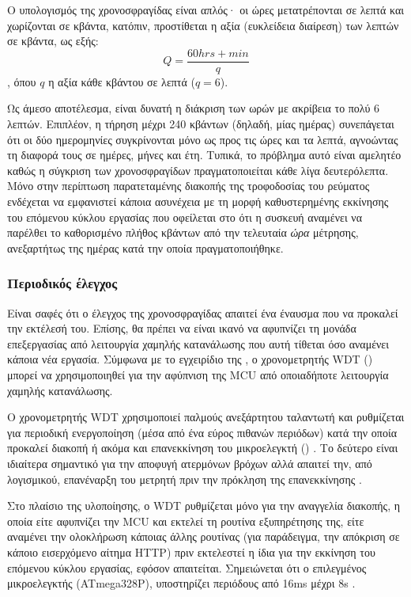 Ο υπολογισμός της χρονοσφραγίδας είναι απλός· οι ώρες μετατρέπονται σε λεπτά και
χωρίζονται σε κβάντα, κατόπιν, προστίθεται η αξία (ευκλείδεια διαίρεση) των
λεπτών σε κβάντα, ως εξής:
\begin{equation}
Q = \frac{60 hrs + min}{q}
\end{equation}
, όπου $q$ η αξία κάθε κβάντου σε λεπτά ($q = 6$).

Ως άμεσο αποτέλεσμα, είναι δυνατή η διάκριση των ωρών με ακρίβεια το πολύ 6
λεπτών. Επιπλέον, η τήρηση μέχρι 240 κβάντων (δηλαδή, μίας ημέρας) συνεπάγεται
ότι οι δύο ημερομηνίες συγκρίνονται μόνο ως προς τις ώρες και τα λεπτά,
αγνοώντας τη διαφορά τους σε ημέρες, μήνες και έτη. Τυπικά, το πρόβλημα αυτό
είναι αμελητέο καθώς η σύγκριση των χρονοσφραγίδων πραγματοποιείται κάθε λίγα
δευτερόλεπτα. Μόνο στην περίπτωση παρατεταμένης διακοπής της τροφοδοσίας του
ρεύματος ενδέχεται να εμφανιστεί κάποια ασυνέχεια με τη μορφή καθυστερημένης
εκκίνησης του επόμενου κύκλου εργασίας που οφείλεται στο ότι η συσκευή αναμένει
να παρέλθει το καθορισμένο πλήθος κβάντων από την τελευταία \emph{ώρα} μέτρησης,
ανεξαρτήτως της ημέρας κατά την οποία πραγματοποιήθηκε.


\subsubsection{Περιοδικός έλεγχος}

Είναι σαφές ότι ο έλεγχος της χρονοσφραγίδας απαιτεί ένα έναυσμα που να προκαλεί
την εκτέλεσή του. Επίσης, θα πρέπει να είναι ικανό να αφυπνίζει τη μονάδα
επεξεργασίας από λειτουργία χαμηλής κατανάλωσης που αυτή τίθεται όσο αναμένει
κάποια νέα εργασία. Σύμφωνα με το εγχειρίδιο της \textcite[38]{atmel13}, ο
χρονομετρητής WDT () μπορεί να χρησιμοποιηθεί για την
αφύπνιση της MCU από οποιαδήποτε λειτουργία χαμηλής κατανάλωσης.

Ο χρονομετρητής WDT χρησιμοποιεί παλμούς ανεξάρτητου ταλαντωτή και ρυθμίζεται
για περιοδική ενεργοποίηση (μέσα από ένα εύρος πιθανών περιόδων) κατά την οποία
προκαλεί διακοπή ή ακόμα και επανεκκίνηση του μικροελεγκτή ()
\parencite[50]{atmel13}. Το δεύτερο είναι ιδιαίτερα σημαντικό για την αποφυγή
ατερμόνων βρόχων αλλά απαιτεί την, από λογισμικού, επανέναρξη του μετρητή πριν
την πρόκληση της επανεκκίνησης \parencite[50]{atmel13}.

Στο πλαίσιο της υλοποίησης, ο WDT ρυθμίζεται μόνο για την αναγγελία διακοπής, η
οποία είτε αφυπνίζει την MCU και εκτελεί τη ρουτίνα εξυπηρέτησης της, είτε
αναμένει την ολοκλήρωση κάποιας άλλης ρουτίνας (για παράδειγμα, την απόκριση σε
κάποιο εισερχόμενο αίτημα HTTP) πριν εκτελεστεί η ίδια για την εκκίνηση του
επόμενου κύκλου εργασίας, εφόσον απαιτείται. Σημειώνεται ότι ο επιλεγμένος
μικροελεγκτής (ATmega328P), υποστηρίζει περιόδους από 16ms μέχρι 8s
\parencite[55]{atmel13}.
